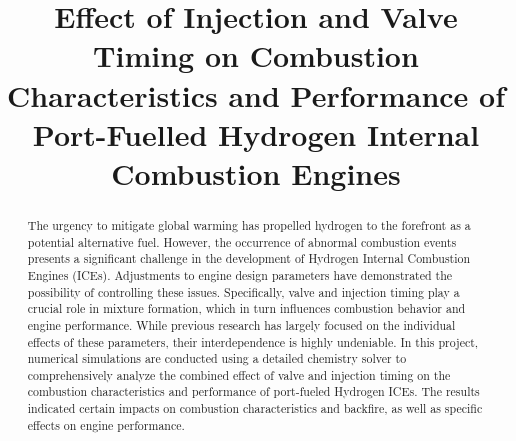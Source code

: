 \documentclass[conference]{IEEEtran}
\begin{document}
\title{Effect of Injection and Valve Timing on Combustion Characteristics and Performance of Port-Fuelled Hydrogen Internal Combustion Engines
}

\author{
\and
{}
\and
{}
\and
{}
\and
{}
}

\maketitle

\begin{abstract}
The urgency to mitigate global warming has propelled hydrogen to the forefront as a potential alternative fuel. However, the occurrence of abnormal combustion events presents a significant challenge in the development of Hydrogen Internal Combustion Engines (ICEs). Adjustments to engine design parameters have demonstrated the possibility of controlling these issues. Specifically, valve and injection timing play a crucial role in mixture formation, which in turn influences combustion behavior and engine performance. While previous research has largely focused on the individual effects of these parameters, their interdependence is highly undeniable. In this project, numerical simulations are conducted using a detailed chemistry solver to comprehensively analyze the combined effect of valve and injection timing on the combustion characteristics and performance of port-fueled Hydrogen ICEs. The results indicated certain impacts on combustion characteristics and backfire, as well as specific effects on engine performance.


\end{abstract}
\end{document}
